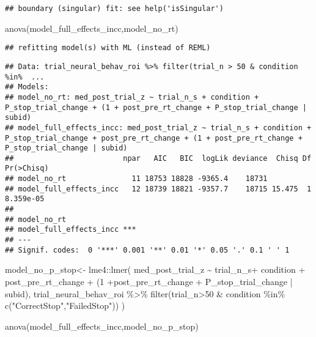 \documentclass[
]{article}
\newenvironment{Shaded}{\begin{snugshade}}{\end{snugshade}}
\newcommand{\DecValTok}[1]{\textcolor[rgb]{0.00,0.00,0.81}{#1}}
\newcommand{\FunctionTok}[1]{\textcolor[rgb]{0.00,0.00,0.00}{#1}}
\newcommand{\NormalTok}[1]{#1}
\newcommand{\OtherTok}[1]{\textcolor[rgb]{0.56,0.35,0.01}{#1}}
\newcommand{\SpecialCharTok}[1]{\textcolor[rgb]{0.00,0.00,0.00}{#1}}
\newcommand{\StringTok}[1]{\textcolor[rgb]{0.31,0.60,0.02}{#1}}
\begin{document}
\begin{verbatim}
## boundary (singular) fit: see help('isSingular')
\end{verbatim}

\begin{Shaded}
\begin{Highlighting}[]
\FunctionTok{anova}\NormalTok{(model\_full\_effects\_incc,model\_no\_rt)}
\end{Highlighting}
\end{Shaded}

\begin{verbatim}
## refitting model(s) with ML (instead of REML)
\end{verbatim}

\begin{verbatim}
## Data: trial_neural_behav_roi %>% filter(trial_n > 50 & condition %in%  ...
## Models:
## model_no_rt: med_post_trial_z ~ trial_n_s + condition + P_stop_trial_change + (1 + post_pre_rt_change + P_stop_trial_change | subid)
## model_full_effects_incc: med_post_trial_z ~ trial_n_s + condition + P_stop_trial_change + post_pre_rt_change + (1 + post_pre_rt_change + P_stop_trial_change | subid)
##                         npar   AIC   BIC  logLik deviance  Chisq Df Pr(>Chisq)
## model_no_rt               11 18753 18828 -9365.4    18731                     
## model_full_effects_incc   12 18739 18821 -9357.7    18715 15.475  1  8.359e-05
##                            
## model_no_rt                
## model_full_effects_incc ***
## ---
## Signif. codes:  0 '***' 0.001 '**' 0.01 '*' 0.05 '.' 0.1 ' ' 1
\end{verbatim}

\begin{Shaded}
\begin{Highlighting}[]
\NormalTok{model\_no\_p\_stop}\OtherTok{\textless{}{-}}\NormalTok{ lme4}\SpecialCharTok{::}\FunctionTok{lmer}\NormalTok{(}
\NormalTok{   med\_post\_trial\_z }\SpecialCharTok{\textasciitilde{}}\NormalTok{ trial\_n\_s}\SpecialCharTok{+}\NormalTok{ condition }\SpecialCharTok{+}\NormalTok{ post\_pre\_rt\_change }\SpecialCharTok{+}\NormalTok{ (}\DecValTok{1} \SpecialCharTok{+}\NormalTok{post\_pre\_rt\_change  }\SpecialCharTok{+}\NormalTok{ P\_stop\_trial\_change  }\SpecialCharTok{|}\NormalTok{ subid),}
\NormalTok{  trial\_neural\_behav\_roi }\SpecialCharTok{\%\textgreater{}\%} \FunctionTok{filter}\NormalTok{(trial\_n}\SpecialCharTok{\textgreater{}}\DecValTok{50} \SpecialCharTok{\&}\NormalTok{ condition }\SpecialCharTok{\%in\%} \FunctionTok{c}\NormalTok{(}\StringTok{"CorrectStop"}\NormalTok{,}\StringTok{"FailedStop"}\NormalTok{))}
\NormalTok{  )}

\FunctionTok{anova}\NormalTok{(model\_full\_effects\_incc,model\_no\_p\_stop)}
\end{Highlighting}
\end{Shaded}
\end{document}
